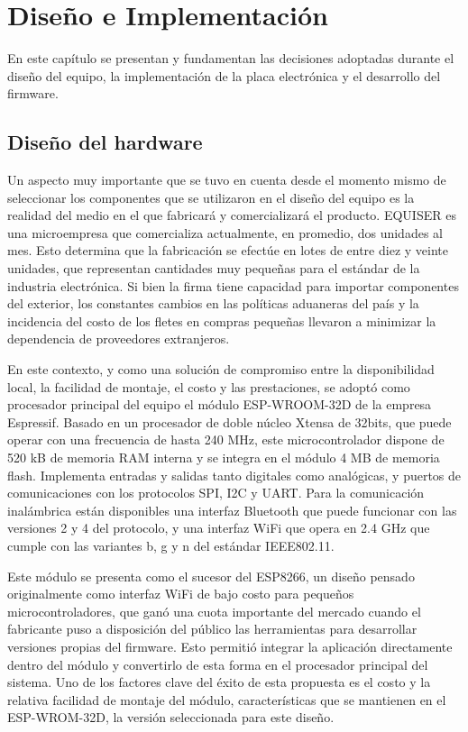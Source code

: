 \chapter{Diseño e Implementación} %
\label{Chapter3} 

En este capítulo se presentan y fundamentan las decisiones adoptadas durante el diseño del equipo, la implementación de la placa electrónica y el desarrollo del firmware.

\section{Diseño del hardware}
\label{sec:hardware}

Un aspecto muy importante que se tuvo en cuenta desde el momento mismo de seleccionar los componentes que se utilizaron en el diseño del equipo es la realidad del medio en el que fabricará y comercializará el producto. EQUISER es una microempresa que comercializa actualmente, en promedio, dos unidades al mes. Esto determina que la fabricación se efectúe en lotes de entre diez y veinte unidades, que representan cantidades muy pequeñas para el estándar de la industria electrónica. Si bien la firma tiene capacidad para importar componentes del exterior, los constantes cambios en las políticas aduaneras del país y la incidencia del costo de los fletes en compras pequeñas llevaron a  minimizar la dependencia de proveedores extranjeros.

En este contexto, y como una solución de compromiso entre la disponibilidad local, la facilidad de montaje, el costo y las prestaciones, se adoptó como procesador principal del equipo el módulo ESP-WROOM-32D de la empresa Espressif. Basado en un procesador de doble núcleo Xtensa de 32bits, que puede operar con una frecuencia de hasta 240 MHz, este microcontrolador dispone de 520 kB de memoria RAM interna y se integra en el módulo 4 MB de memoria flash. Implementa entradas y salidas tanto digitales como analógicas, y puertos de comunicaciones con los protocolos SPI, I2C y UART. Para la comunicación inalámbrica están disponibles una interfaz Bluetooth que puede funcionar con las versiones 2 y 4 del protocolo, y una interfaz WiFi que opera en 2.4 GHz que cumple con las variantes b, g y n del estándar IEEE802.11.

Este módulo se presenta como el sucesor del ESP8266, un diseño pensado originalmente como interfaz WiFi de bajo costo para pequeños microcontroladores, que ganó una cuota importante del mercado cuando el fabricante puso a disposición del público las herramientas para desarrollar versiones propias del firmware. Esto permitió integrar la aplicación directamente dentro del módulo y convertirlo de esta forma en el procesador principal del sistema. Uno de los factores clave del éxito de esta propuesta es el costo y la relativa facilidad de montaje del módulo, características que se mantienen en el ESP-WROM-32D, la versión seleccionada para este diseño. 

